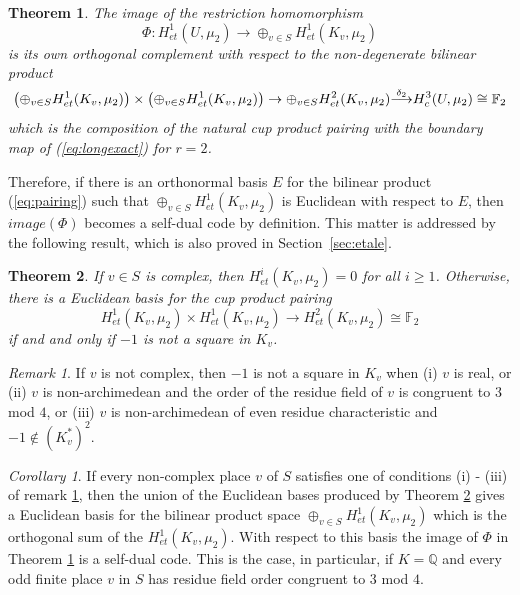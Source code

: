 \documentclass[noams]{compositio}
\newtheorem{thm}{Theorem}[section] %
\theoremstyle{definition} %
\theoremstyle{remark} %
\newtheorem{rem}{Remark}
\newtheorem{cor}{Corollary}
\newcommand{\F}{\mathbb{F}}
\newcommand{\Q}{\mathbb{Q}}
\def\arrow#1#2{\smash{\mathop{\longrightarrow}\limits^{#1}_{#2}}} %
\begin{document}
\begin{thm}\label{thm:dual}
The image of the restriction homomorphism 
\[\Phi\colon H^1_{et}(U, \mu_2)\to \oplus_{v\in S} H^1_{et}(K_v, \mu_2)\]
 is its own orthogonal complement with respect to the non-degenerate bilinear product
\begin{equation}
\label{eq:pairing}
\left ( \oplus_{v \in S} H^1_{et}(K_v, \mu_2)\right ) \times \left ( \oplus_{v\in S} H^1_{et}(K_v, \mu_2)\right ) \to \oplus_{v \in S} H^2_{et}(K_v, \mu_2)\arrow{\delta_2}{} H^3_c(U, \mu_2) \cong \F_2
\end{equation}
which is the composition of the natural cup product pairing with the boundary map of (\ref{eq:longexact}) for $r = 2$.
\end{thm}

Therefore, if there is an orthonormal basis $E$ for the bilinear product (\ref{eq:pairing}) such that  $\oplus_{v \in S} H^1_{et}(K_v, \mu_2)$ is Euclidean with respect to $E$, then $image(\Phi)$ becomes a self-dual code by definition. This matter is addressed by the following result, which is also proved in Section~\ref{sec:etale}.

\begin{thm}\label{thm:euclid} If $v \in S$ is complex, then $H^i_{et}(K_v,\mu_2) = 0$ for all $i \ge 1$.
Otherwise,  there is a Euclidean basis for the cup product pairing
$$H^1_{et}(K_v, \mu_2) \times H^1_{et}(K_v,\mu_2) \to H^2_{et}(K_v,\mu_2) \cong \F_2$$ if and and only if $-1$ is not a square in $K_v$.  
\end{thm}

\begin{rem}\label{rem:euclid}
If $v$ is not complex, then $-1$ is not a square in $K_v$ when (i) $v$ is real, or 
(ii) $v$ is non-archimedean and the order of the residue field of $v$ is congruent to $3$ mod $4$, or (iii) $v$ is
non-archimedean of even residue characteristic and $-1 \not \in (K_v^*)^2$.
\end{rem} 

\begin{cor}
\label{cor:Euclidresult}
If every non-complex place $v$ of $S$ satisfies one of conditions (i) - (iii) of remark \ref{rem:euclid}, then
the union of the Euclidean bases produced by Theorem \ref{thm:euclid} gives a Euclidean
basis for the bilinear product space $\oplus_{v \in S} H^1_{et}(K_v, \mu_2)$ which is the orthogonal sum of the $H^1_{et}(K_v,\mu_2)$.  With respect to this basis the image of $\Phi$
in Theorem \ref{thm:dual} is a self-dual code.  This is the case, in particular, if $K = \Q$ and
every odd finite place $v$ in $S$ has residue field order congruent to $3$ mod $4$.
\end{cor}
\end{document}
